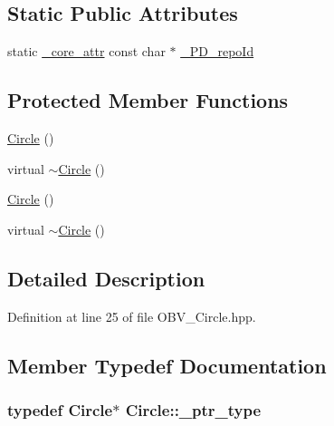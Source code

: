\subsection*{Static Public Attributes}
\begin{DoxyCompactItemize}
\item 
static \hyperlink{_petit_prince_8hpp_a5f7bf7cddb608c2aad7c95f55f8a33c5}{\+\_\+core\+\_\+attr} const char $\ast$ \hyperlink{class_circle_a3cc85c810268073e3c3f0519aa3b12a0}{\+\_\+\+P\+D\+\_\+repo\+Id}
\end{DoxyCompactItemize}
\subsection*{Protected Member Functions}
\begin{DoxyCompactItemize}
\item 
\hyperlink{class_circle_ad1ecfcfc7bf34529c6a6d6c448bf70fe}{Circle} ()
\item 
virtual \hyperlink{class_circle_ad02555ca63f3574193b958c49f81d178}{$\sim$\+Circle} ()
\item 
\hyperlink{class_circle_ad1ecfcfc7bf34529c6a6d6c448bf70fe}{Circle} ()
\item 
virtual \hyperlink{class_circle_ad02555ca63f3574193b958c49f81d178}{$\sim$\+Circle} ()
\end{DoxyCompactItemize}


\subsection{Detailed Description}


Definition at line 25 of file O\+B\+V\+\_\+\+Circle.\+hpp.



\subsection{Member Typedef Documentation}
\subsubsection[{\texorpdfstring{\+\_\+ptr\+\_\+type}{_ptr_type}}]{\setlength{\rightskip}{0pt plus 5cm}typedef {\bf Circle}$\ast$ {\bf Circle\+::\+\_\+ptr\+\_\+type}}\hypertarget{class_circle_ae284325f0ac7647d6e137e8a3f507f38}{}\label{class_circle_ae284325f0ac7647d6e137e8a3f507f38}


